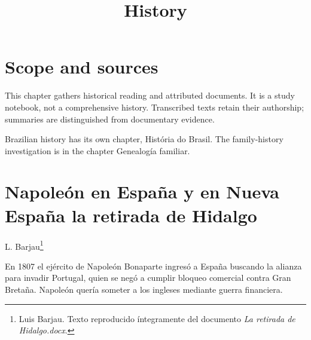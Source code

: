



\title{History}
\maketitle

\label{section-phantom}

\tableofcontents

\section{Scope and sources}
\label{section-history-scope}

This chapter gathers historical reading
and attributed documents. It is a study
notebook, not a comprehensive history.
Transcribed texts retain their authorship;
summaries are distinguished from
documentary evidence.

Brazilian history has its own chapter,
História do Brasil. The family-history
investigation is in the chapter
Genealogía familiar.

\section{Napoleón en España y en Nueva España
la retirada de Hidalgo}
\label{section-retirada-de-hidalgo}


L. Barjau\footnote{Luis Barjau.
Texto reproducido íntegramente del documento
\emph{La retirada de Hidalgo.docx}.}

En 1807 el ejército de Napoleón Bonaparte
ingresó a España buscando la alianza para
invadir Portugal, quien se negó a cumplir
bloqueo comercial contra Gran Bretaña.
Napoleón quería someter a los ingleses
mediante guerra financiera.

